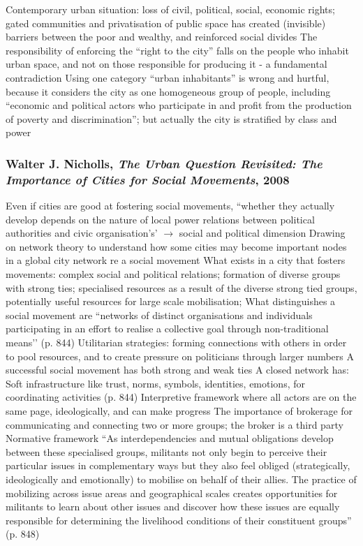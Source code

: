 \documentclass{article}
\begin{document}
\begin{outline}
	\1 Contemporary urban situation: loss of civil, political, social, economic rights; gated communities and privatisation of public space has created (invisible) barriers between the poor and wealthy, and reinforced social divides
	\1 The responsibility of enforcing the ``right to the city'' falls on the people who inhabit urban space, and not on those responsible for producing it - a fundamental contradiction 
		\2 Using one category ``urban inhabitants'' is wrong and hurtful, because it considers the city as one homogeneous group of people, including ``economic and political actors who participate in and profit from the production of poverty and discrimination''; but actually the city is stratified by class and power
\end{outline}

\subsubsection{Walter J. Nicholls, \textit{The Urban Question Revisited: The Importance of Cities for Social Movements}, 2008}

\begin{outline}
	\1 Even if cities are good at fostering social movements, ``whether they actually develop depends on the nature of local power relations between political authorities and civic organisation's' $\rightarrow$ social and political dimension
	\1 Drawing on network theory to understand how some cities may become important nodes in a global city network re a social movement
	\1 What exists in a city that fosters movements: complex social and political relations; formation of diverse groups with strong ties; specialised resources as a result of the diverse strong tied groups, potentially useful resources for large scale mobilisation;
	\1 What distinguishes a social movement are ``networks of distinct organisations and individuals participating in an effort to realise a collective goal through non-traditional means’’ (p. 844)
	\1 Utilitarian strategies: forming connections with others in order to pool resources, and to create pressure on politicians through larger numbers
	\1 A successful social movement has both strong and weak ties
	\1 A closed network has:
		\2 Soft infrastructure like trust, norms, symbols, identities, emotions, for coordinating activities (p. 844)
		\2 Interpretive framework where all actors are on the same page, ideologically, and can make progress 
	\1 The importance of brokerage for communicating and connecting two or more groups; the broker is a third party 
	\1 Normative framework
	\1 ``As interdependencies and mutual obligations develop between these specialised groups, militants not only begin to perceive their particular issues in complementary ways but they also feel obliged (strategically, ideologically and emotionally) to mobilise on behalf of their allies. The practice of mobilizing across issue areas and geographical scales creates opportunities for militants to learn about other issues and discover how these issues are equally responsible for determining the livelihood conditions of their constituent groups'' (p. 848)

\end{outline}
\end{document}
